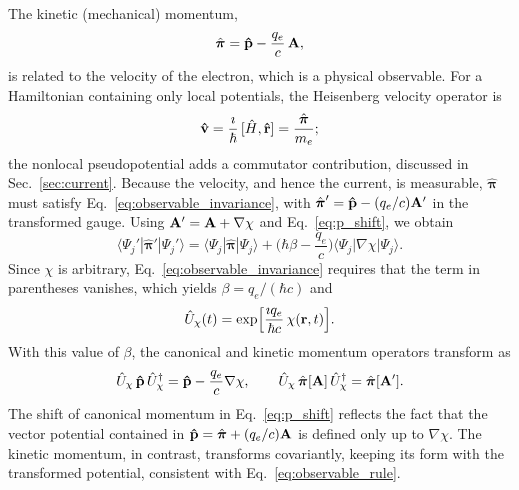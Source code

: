 The kinetic (mechanical) momentum,
\begin{equation}
  \hat{\boldsymbol{\pi}} = \vb{\hat p} - \frac{q_e}{c}\,\vb A ,
  \label{eq:kinetic_momentum}
\end{equation}
is related to the velocity of the electron, which is a physical observable. For
a Hamiltonian containing only local potentials, the Heisenberg velocity
operator is
\begin{equation}
  \vb{\hat v} = \frac{\imath}{\hbar}\,[\hat H,\vb{\hat r}]
             = \frac{\hat{\boldsymbol{\pi}}}{m_e} ;
  \label{eq:velocity_operator}
\end{equation}
the nonlocal pseudopotential adds a commutator contribution, discussed in
Sec.~\ref{sec:current}. Because the velocity, and hence the current, is
measurable, $\hat{\boldsymbol{\pi}}$ must satisfy
Eq.~\eqref{eq:observable_invariance}, with
$\hat{\boldsymbol{\pi}}' = \vb{\hat p} - (q_e/c)\vb A'$ in the transformed gauge.
Using $\vb A' = \vb A + \nabla\chi$ and Eq.~\eqref{eq:p_shift}, we obtain
\begin{equation}
  \langle\Psi_j'|\hat{\boldsymbol{\pi}}'|\Psi_j'\rangle
  = \langle\Psi_j|\hat{\boldsymbol{\pi}}|\Psi_j\rangle
  + \Big(\hbar\beta - \frac{q_e}{c}\Big)\langle\Psi_j|\nabla\chi|\Psi_j\rangle .
  \label{eq:pi_expectation}
\end{equation}
Since $\chi$ is arbitrary, Eq.~\eqref{eq:observable_invariance}
requires that the term in parentheses vanishes, which yields
$\beta = q_e/(\hbar c)$ and
\begin{equation}
  \hat U_\chi(t) = \exp\!\Big[\frac{\imath q_e}{\hbar c}\,\chi(\vb r,t)\Big] .
  \label{eq:U_final}
\end{equation}
With this value of $\beta$, the canonical and kinetic momentum operators
transform as
\begin{equation}
  \hat U_\chi\,\vb{\hat p}\,\hat U_\chi^\dagger = \vb{\hat p} - \frac{q_e}{c}\nabla\chi,
  \qquad
  \hat U_\chi\,\hat{\boldsymbol{\pi}}[\vb A]\,\hat U_\chi^\dagger
  = \hat{\boldsymbol{\pi}}[\vb A'] .
  \label{eq:momentum_transform}
\end{equation}
The shift of canonical momentum in Eq.~\eqref{eq:p_shift} 
reflects the fact that the vector potential contained in
$\vb{\hat p} = \hat{\boldsymbol{\pi}} + (q_e/c)\vb A$  is defined only up
to $\nabla\chi$. The kinetic momentum, in contrast, transforms covariantly, 
keeping its form with the transformed potential, consistent with
Eq.~\eqref{eq:observable_rule}.






